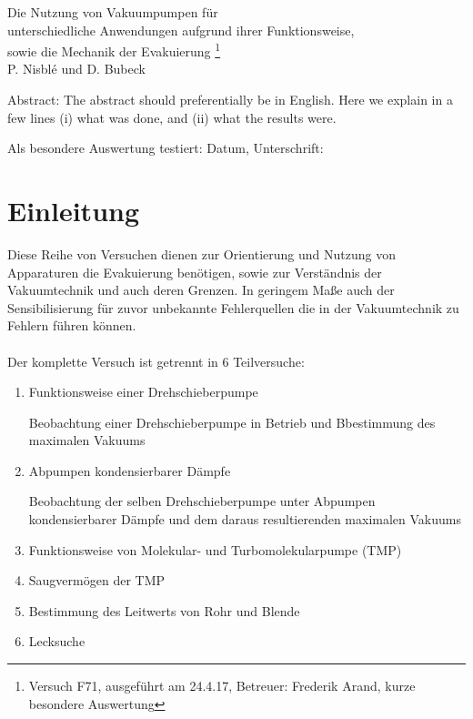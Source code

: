 \documentclass[12pt, a4paper]{scrartcl}
\begin{document}
	
	\thispagestyle{empty}
	\null\vspace{40mm}
	\begin{center}
		{
			\Large  Die Nutzung von Vakuumpumpen für\\ unterschiedliche Anwendungen aufgrund ihrer Funktionsweise,\\ 
			sowie die Mechanik der Evakuierung	
			\footnote{
				\noindent Versuch F71, ausgeführt am 24.4.17,
				Betreuer: Frederik Arand,
				kurze besondere Auswertung
			}
		}\\[15mm]
		P. Nisblé und D. Bubeck
		
		\vspace{25mm}
		
		\parbox{0.9\textwidth}{
			Abstract:    
			\small The abstract should preferentially be in English. Here we explain in a
			few lines (i) what was done, and (ii) what the results were.
		}
	\end{center}
	
	\vfill
	Als besondere Auswertung testiert: Datum, Unterschrift:
	\vspace{20mm}
	
	\newpage  
	\null\thispagestyle{empty} 
	
	
	\newpage
	
	\section{Einleitung}
		Diese Reihe von Versuchen dienen zur Orientierung und Nutzung von Apparaturen die Evakuierung benötigen, sowie zur Verständnis der Vakuumtechnik und auch deren Grenzen. In geringem Maße auch der Sensibilisierung für zuvor unbekannte Fehlerquellen die in der Vakuumtechnik zu Fehlern führen können.\\\\
		Der komplette Versuch ist getrennt in 6 Teilversuche:
		\begin{enumerate}
			\item Funktionsweise einer Drehschieberpumpe
			
				Beobachtung einer Drehschieberpumpe in Betrieb und Bbestimmung des maximalen Vakuums

			\item Abpumpen kondensierbarer Dämpfe
				
				Beobachtung der selben Drehschieberpumpe unter Abpumpen kondensierbarer Dämpfe und dem daraus resultierenden maximalen Vakuums

			\item Funktionsweise von Molekular- und Turbomolekularpumpe (TMP)
			
			\item Saugvermögen der TMP
			
			\item Bestimmung des Leitwerts von Rohr und Blende
			
			\item Lecksuche
		\end{enumerate}
	
\end{document}
